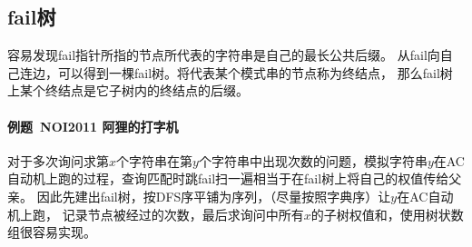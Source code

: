 \subsection{fail树}
容易发现fail指针所指的节点所代表的字符串是自己的最长公共后缀。
从fail向自己连边，可以得到一棵fail树。将代表某个模式串的节点称为终结点，
那么fail树上某个终结点是它子树内的终结点的后缀。

\paragraph{例题~NOI2011 阿狸的打字机}
对于多次询问求第$x$个字符串在第$y$个字符串中出现次数的问题，模拟字符串$y$在AC
自动机上跑的过程，查询匹配时跳fail扫一遍相当于在fail树上将自己的权值传给父亲。
因此先建出fail树，按DFS序平铺为序列，（尽量按照字典序）让$y$在AC自动机上跑，
记录节点被经过的次数，最后求询问中所有$x$的子树权值和，使用树状数组很容易实现。
